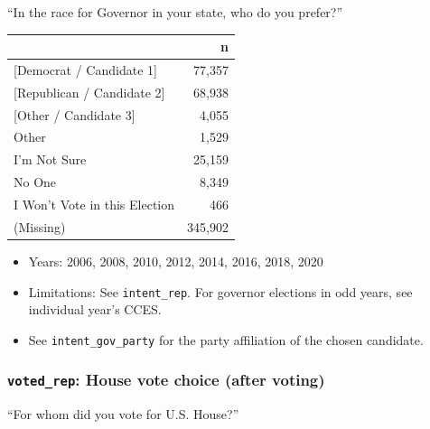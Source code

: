 \documentclass[10pt,article,oneside]{memoir}
\theoremstyle{definition}
\begin{document}
``In the race for Governor in your state, who do you prefer?''

\begin{table}[H]
\centering
\begin{tabular}{lr}
\toprule
 & n\\
\midrule
{[Democrat / Candidate 1]} & 77,357\\
{[Republican / Candidate 2]} & 68,938\\
{[Other / Candidate 3]} & 4,055\\
Other & 1,529\\
I'm Not Sure & 25,159\\
No One & 8,349\\
I Won't Vote in this Election & 466\\
(Missing) & 345,902\\
\bottomrule
\end{tabular}
\end{table}

\begin{itemize}
\tightlist
\item
  Years: 2006, 2008, 2010, 2012, 2014, 2016, 2018, 2020
\item
  Limitations: See \texttt{intent\_rep}. For governor elections in odd
  years, see individual year's CCES.
\item
  See \texttt{intent\_gov\_party} for the party affiliation of the
  chosen candidate.
\end{itemize}

\hypertarget{voted_rep-house-vote-choice-after-voting}{%
\subsubsection{\texorpdfstring{\texttt{voted\_rep}: House vote choice
(after
voting)}{voted\_rep: House vote choice (after voting)}}\label{voted_rep-house-vote-choice-after-voting}}

``For whom did you vote for U.S. House?''
\end{document}
